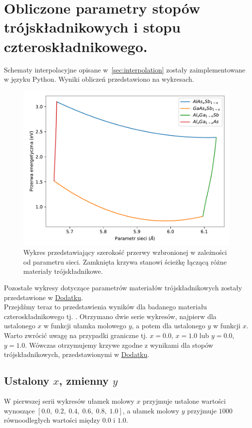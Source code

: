 \documentclass[12pt,openany,a4paper]{book}
\begin{document}
\section{Obliczone parametry stopów trójskładnikowych i stopu czteroskładnikowego.}

Schematy interpolacyjne opisane w~\ref{sec:interpolation} zostały zaimplementowane w języku Python.
Wyniki obliczeń przedstawiono na wykresach.\\

\begin{figure}[H]
	\centering
	\includegraphics[width = \linewidth]{Figures/ternary/Eg_alc.pdf}
	\caption{Wykres przedstawiający szerokość przerwy wzbronionej w zależności od parametru sieci.
	Zamknięta krzywa stanowi ścieżkę łączącą różne materiały trójskładnikowe.}\label{fig:Eg_alc}
\end{figure}
\pagebreak
Pozostałe wykresy dotyczące parametrów materiałów trójskładnikowych zostały przedstawione w \hyperref[chapt:dodatek]{Dodatku}.\\

Przejdźmy teraz to przedstawienia wyników dla badanego materiału 
czteroskładnikowego tj. . 
Otrzymano dwie serie wykresów, najpierw dla ustalonego \(x\) w funkcji ułamka
molowego \(y\), a potem dla ustalonego \(y\) w funkcji \(x\). Warto zwrócić uwagę
na przypadki graniczne tj. \(x = 0.0\), \(x =  1.0\) lub \(y = 0.0\), \(y =  1.0\). Wówczas otrzymujemy
krzywe zgodne z wynikami dla stopów trójskładnikowych, przedstawionymi w \hyperref[chapt:dodatek]{Dodatku}.

\subsection{Ustalony \(x\), zmienny \(y\)}
W pierwszej serii wykresów ułamek molowy \(x\) przyjmuje ustalone
wartości wynoszące \([0.0,\;0.2,\; 0.4,\; 0.6,\; 0.8,\; 1.0]\), a ułamek molowy \(y\)
przyjmuje \(1000\) równoodległych wartości między \(0.0\) i \(1.0\).
\end{document}
